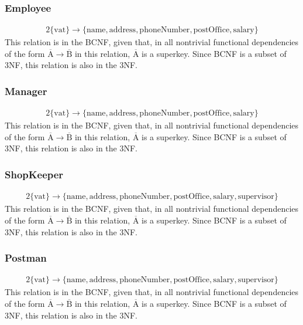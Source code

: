 \documentclass{report}[a4paper]
\theoremstyle{remark}
\begin{document}
\subsubsection{Employee}
\begin{alignat*}{2}
\{\text{vat}\} \rightarrow \{\text{name},\text{address},\text{phoneNumber},\text{postOffice},\text{salary}\}
\end{alignat*}
This relation is in the BCNF, given that, in all nontrivial functional dependencies of the form $\overline{\text{A}} \rightarrow \overline{\text{B}}$ in this relation, $\overline{\text{A}}$ is a superkey. Since BCNF is a subset of 3NF, this relation is also in the 3NF.
\subsubsection{Manager}
\begin{alignat*}{2}
\{\text{vat}\} \rightarrow \{\text{name},\text{address},\text{phoneNumber},\text{postOffice},\text{salary}\}
\end{alignat*}
This relation is in the BCNF, given that, in all nontrivial functional dependencies of the form $\overline{\text{A}} \rightarrow \overline{\text{B}}$ in this relation, $\overline{\text{A}}$ is a superkey. Since BCNF is a subset of 3NF, this relation is also in the 3NF.
\subsubsection{ShopKeeper}
\begin{alignat*}{2}
\{\text{vat}\} \rightarrow \{\text{name},\text{address},\text{phoneNumber},\text{postOffice},\text{salary}, \text{supervisor}\}
\end{alignat*}
This relation is in the BCNF, given that, in all nontrivial functional dependencies of the form $\overline{\text{A}} \rightarrow \overline{\text{B}}$ in this relation, $\overline{\text{A}}$ is a superkey. Since BCNF is a subset of 3NF, this relation is also in the 3NF.
\subsubsection{Postman}
\begin{alignat*}{2}
\{\text{vat}\} \rightarrow \{\text{name},\text{address},\text{phoneNumber},\text{postOffice},\text{salary}, \text{supervisor}\}
\end{alignat*}
This relation is in the BCNF, given that, in all nontrivial functional dependencies of the form $\overline{\text{A}} \rightarrow \overline{\text{B}}$ in this relation, $\overline{\text{A}}$ is a superkey. Since BCNF is a subset of 3NF, this relation is also in the 3NF.
\end{document}

